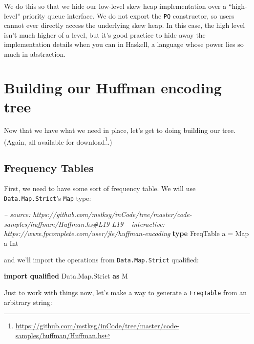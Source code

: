\documentclass[]{article}
\newenvironment{Shaded}{}{}
\newcommand{\KeywordTok}[1]{\textcolor[rgb]{0.00,0.44,0.13}{\textbf{#1}}}
\newcommand{\DataTypeTok}[1]{\textcolor[rgb]{0.56,0.13,0.00}{#1}}
\newcommand{\CommentTok}[1]{\textcolor[rgb]{0.38,0.63,0.69}{\textit{#1}}}
\newcommand{\FunctionTok}[1]{\textcolor[rgb]{0.02,0.16,0.49}{#1}}
\newcommand{\NormalTok}[1]{#1}
\renewcommand{\href}[2]{#2\footnote{\url{#1}}}
\begin{document}
We do this so that we hide our low-level skew heap implementation over a
``high-level'' priority queue interface. We do not export the \texttt{PQ}
constructor, so users cannot ever directly access the underlying skew heap. In
this case, the high level isn't much higher of a level, but it's good practice
to hide away the implementation details when you can in Haskell, a language
whose power lies so much in abstraction.

\section{Building our Huffman encoding
tree}\label{building-our-huffman-encoding-tree}

Now that we have what we need in place, let's get to doing building our tree.
(Again, all available
\href{https://github.com/mstksg/inCode/tree/master/code-samples/huffman/Huffman.hs}{for
download}.)

\subsection{Frequency Tables}\label{frequency-tables}

First, we need to have some sort of frequency table. We will use
\texttt{Data.Map.Strict}'s \texttt{Map} type:

\begin{Shaded}
\begin{Highlighting}[]
\CommentTok{-- source: https://github.com/mstksg/inCode/tree/master/code-samples/huffman/Huffman.hs#L19-L19}
\CommentTok{-- interactive: https://www.fpcomplete.com/user/jle/huffman-encoding}
\KeywordTok{type} \DataTypeTok{FreqTable}\NormalTok{ a }\FunctionTok{=} \DataTypeTok{Map}\NormalTok{ a }\DataTypeTok{Int}
\end{Highlighting}
\end{Shaded}

and we'll import the operations from \texttt{Data.Map.Strict} qualified:

\begin{Shaded}
\begin{Highlighting}[]
\KeywordTok{import qualified} \DataTypeTok{Data.Map.Strict} \KeywordTok{as} \DataTypeTok{M}
\end{Highlighting}
\end{Shaded}

Just to work with things now, let's make a way to generate a \texttt{FreqTable}
from an arbitrary string:
\end{document}

